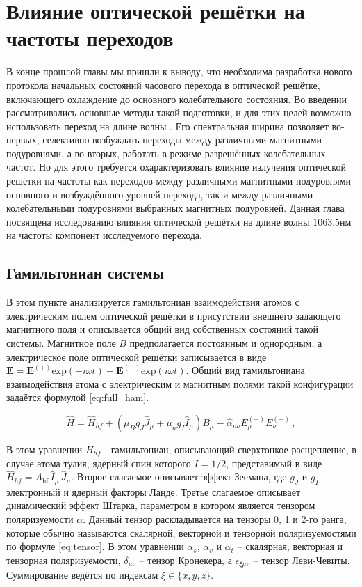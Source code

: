 \chapter{Влияние оптической решётки на частоты переходов}\label{ch:ch2}

В конце прошлой главы мы пришли к выводу, что необходима разработка нового протокола начальных состояний часового перехода в оптической решётке, включающего охлаждение до основного колебательного состояния. 
Во введении рассматривались основные методы такой подготовки, и для этих целей возможно использовать переход на длине волны \thd.
Его спектральная ширина позволяет во-первых, селективно возбуждать переходы между различными магнитными подуровнями, а во-вторых, работать в режиме разрешённых колебательных частот. 
Но для этого требуется охарактеризовать влияние излучения оптической решётки на частоты как переходов между различными магнитными подуровнями основного и возбуждённого уровней перехода, так и между различными колебательными подуровнями выбранных магнитных подуровней. 
Данная глава посвящена исследованию влияния оптической решётки на длине волны $1063.5\unit{нм}$ на частоты компонент исследуемого перехода.

\section{Гамильтониан системы}
В этом пункте анализируется гамильтониан взаимодействия атомов с электрическим полем оптической решётки в присутствии внешнего задающего магнитного поля и описывается общий вид собственных состояний такой системы.
Магнитное поле $B$ предполагается постоянным и однородным, а электрическое поле оптической решётки записывается в виде $\mathbf{E} = \mathbf{E}^{(+)}\mathrm{exp}(-i \omega t) + \mathbf{E}^{(-)}\mathrm{exp}(i \omega t)$.
Общий вид гамильтониана взаимодействия атома с электрическим и магнитным полями такой конфигурации задаётся формулой \ref{eq:full_ham}.

\begin{equation} \label{eq:full_ham}
	\hat{H} = \hat{H}_{hf} + \left(\mu_B g_J \hat{J}_\mu + \mu_n g_I \hat{I}_\mu \right)B_\mu -\hat{\alpha}_{\mu\nu}E_{\mu}^{(-)}E_{\nu}^{(+)}\,,
\end{equation}

В этом уравнении $H_{hf}$ - гамильтониан, описывающий сверхтонкое расщепление, в случае атома тулия, ядерный спин которого $I=1/2$, представимый в виде $\hat{H}_{hf} = A_\textrm{hf}\,\hat{I}_\mu\,\hat{J}_\mu$.
Второе слагаемое описывает эффект Зеемана, где $g_J$ и $g_I$ - электронный и ядерный факторы Ланде.
Третье слагаемое описывает динамический эффект Штарка, параметром в котором является тензором поляризуемости $\alpha$.
Данный тензор раскладывается на тензоры 0, 1 и 2-го ранга, которые обычно называются скалярной, векторной и тензорной поляризуемостями по формуле \ref{eq:tensor}.
В этом уравнении $\alpha_s$, $\alpha_v$ и $\alpha_t$ -- скалярная, векторная и тензорная поляризуемости, $\delta_{\mu\nu}$ -- тензор Кронекера, а $\epsilon_{\xi\mu\nu}$ -- тензор Леви-Чевиты.
Суммирование ведётся по индексам $\xi \in \{x,y,z\}$. 

